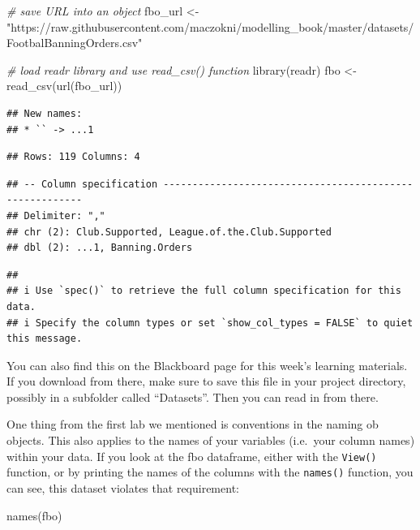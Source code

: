 \documentclass[
]{book}
\newenvironment{Shaded}{\begin{snugshade}}{\end{snugshade}}
\newcommand{\CommentTok}[1]{\textcolor[rgb]{0.56,0.35,0.01}{\textit{#1}}}
\newcommand{\FunctionTok}[1]{\textcolor[rgb]{0.00,0.00,0.00}{#1}}
\newcommand{\NormalTok}[1]{#1}
\newcommand{\OtherTok}[1]{\textcolor[rgb]{0.56,0.35,0.01}{#1}}
\newcommand{\StringTok}[1]{\textcolor[rgb]{0.31,0.60,0.02}{#1}}
\begin{document}
\begin{Shaded}
\begin{Highlighting}[]
\CommentTok{\# save URL into an object}
\NormalTok{fbo\_url }\OtherTok{\textless{}{-}} \StringTok{"https://raw.githubusercontent.com/maczokni/modelling\_book/master/datasets/FootbalBanningOrders.csv"}

\CommentTok{\# load readr library and use read\_csv() function}
\FunctionTok{library}\NormalTok{(readr)}
\NormalTok{fbo }\OtherTok{\textless{}{-}} \FunctionTok{read\_csv}\NormalTok{(}\FunctionTok{url}\NormalTok{(fbo\_url))}
\end{Highlighting}
\end{Shaded}

\begin{verbatim}
## New names:
## * `` -> ...1
\end{verbatim}

\begin{verbatim}
## Rows: 119 Columns: 4
\end{verbatim}

\begin{verbatim}
## -- Column specification --------------------------------------------------------
## Delimiter: ","
## chr (2): Club.Supported, League.of.the.Club.Supported
## dbl (2): ...1, Banning.Orders
\end{verbatim}

\begin{verbatim}
## 
## i Use `spec()` to retrieve the full column specification for this data.
## i Specify the column types or set `show_col_types = FALSE` to quiet this message.
\end{verbatim}

You can also find this on the Blackboard page for this week's learning materials. If you download from there, make sure to save this file in your project directory, possibly in a subfolder called ``Datasets''. Then you can read in from there.

One thing from the first lab we mentioned is conventions in the naming ob objects. This also applies to the names of your variables (i.e.~your column names) within your data. If you look at the fbo dataframe, either with the \texttt{View()} function, or by printing the names of the columns with the \texttt{names()} function, you can see, this dataset violates that requirement:

\begin{Shaded}
\begin{Highlighting}[]
\FunctionTok{names}\NormalTok{(fbo)}
\end{Highlighting}
\end{Shaded}
\end{document}
